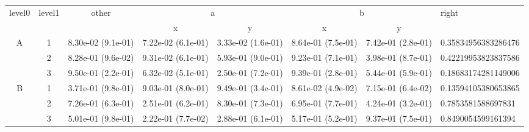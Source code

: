\begin{tabular}{cccccccl}
\toprule
\multirow{2}{*}{level0} & \multirow{2}{*}{level1}& \multirow{2}{*}{other}&\multicolumn{2}{c}{a}&\multicolumn{2}{c}{b}& \multirow{2}{*}{right}\tabularnewline
\cmidrule(lr){4-5}
\cmidrule(lr){6-7}
&&&x&y&x&y\tabularnewline
\midrule
\multirow{3}{*}{A}&1& 8.30e-02 (9.1e-01)& 7.22e-02 (6.1e-01)& 3.33e-02 (1.6e-01)& 8.64e-01 (7.5e-01)& 7.42e-01 (2.8e-01)& 0.35834956383286476\tabularnewline
&2& 8.28e-01 (9.6e-02)& 9.31e-02 (6.1e-01)& 5.93e-01 (9.0e-01)& 9.23e-01 (7.1e-01)& 3.98e-01 (8.7e-01)& 0.42219953823837586\tabularnewline
&3& 9.50e-01 (2.2e-01)& 6.32e-02 (5.1e-01)& 2.50e-01 (7.2e-01)& 9.39e-01 (2.8e-01)& 5.44e-01 (5.9e-01)& 0.18683174281149006\tabularnewline
\midrule
\multirow{3}{*}{B}&1& 3.71e-01 (9.8e-01)& 9.03e-01 (8.0e-01)& 9.49e-01 (3.4e-01)& 8.61e-02 (4.9e-02)& 7.15e-01 (6.4e-02)& 0.13594105380653865\tabularnewline
&2& 7.26e-01 (6.3e-01)& 2.51e-01 (6.2e-01)& 8.30e-01 (7.3e-01)& 6.95e-01 (7.7e-01)& 4.24e-01 (3.2e-01)& 0.7853581588697831\tabularnewline
&3& 5.01e-01 (9.8e-01)& 2.22e-01 (7.7e-02)& 2.88e-01 (6.1e-01)& 5.17e-01 (5.2e-01)& 9.37e-01 (7.5e-01)& 0.8490054599161394\tabularnewline
\bottomrule
\end{tabular}
